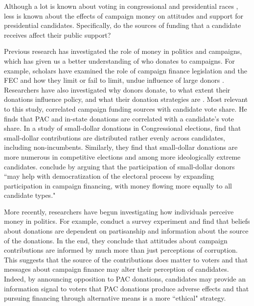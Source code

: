 \documentclass[12pt]{article}
\begin{document}
 Although a lot is known about voting in congressional \citep{abramowitz_explaining_1988, welch_effects_1997} and presidential races \citep{petrocik_issue_1996, nadeau_national_2001, polsby_landmarks_2002}, less is known about the effects of campaign money on attitudes and support for presidential candidates. Specifically, do the sources of funding that a candidate receives affect their public support? 
 
 Previous research has investigated the role of money in politics and campaigns, which has given us a better understanding of who donates to campaigns. For example, scholars have examined the role of campaign finance legislation and the FEC and how they limit or fail to limit, undue influence of large donors  \citep{magleby_money_2010, raja_small_2008}. Researchers have also investigated why donors donate, to what extent their donations influence policy, and what their donation strategies are \citep{francia_financiers_2003}. Most relevant to this study, \citet{alexander_good_2005} correlated campaign funding sources with candidate vote share. He finds that PAC and in-state donations are correlated with a candidate's vote share. In a study of small-dollar donations in Congressional elections, \citep{culberson_small_2019} find that small-dollar contributions are distributed rather evenly across candidates, including non-incumbents. Similarly, they find that small-dollar donations are more numerous in competitive elections and among more ideologically extreme candidates. \citep{culberson_small_2019} conclude by arguing that the participation of small-dollar donors ``may help with democratization of the electoral process by expanding participation in campaign financing, with money flowing more equally to all candidate types."   
 
 More recently, researchers have begun investigating how individuals perceive money in politics. For example, \citet{bowler_campaign_2016} conduct a survey experiment and find that beliefs about donations are dependent on partisanship and information about the source of the donations. In the end, they conclude that attitudes about campaign contributions are informed by much more than just perceptions of corruption. This suggests that the source of the contributions does matter to voters and that messages about campaign finance may alter their perception of candidates. Indeed, by announcing opposition to PAC donations, candidates may provide an information signal to voters that PAC donations produce adverse effects and that pursuing financing through alternative means is a more ``ethical" strategy. 
 
\end{document}
